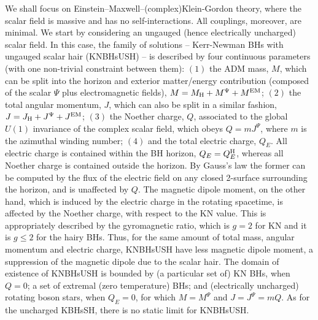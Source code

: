 \documentclass{article}
\begin{document}
We shall focus on Einstein--Maxwell--(complex)Klein-Gordon theory, where the scalar field is massive and has no self-interactions. All couplings, moreover, are minimal. We start by considering an ungauged (hence electrically uncharged) scalar field. In this case, the family of solutions -- Kerr-Newman BHs with ungauged scalar hair (KNBHsUSH) -- is described by four continuous parameters (with one non-trivial constraint between them): $(1)$ the ADM mass, $M$, which can be split into the horizon and exterior matter/energy contribution (composed of the scalar $\Psi$ plus electromagnetic fields), $M=M_{\rm H}+M^\Psi+M^{\rm EM}$; $(2)$ the total angular momentum, $J$, which can also be split in a similar fashion, $J=J_{\rm H}+J^\Psi+J^{\rm EM}$; $(3)$ the  Noether charge, $Q$, associated to the global $U(1)$ invariance of the complex scalar field, which obeys $Q=mJ^\Psi$, where $m$ is the azimuthal winding number; $(4)$ and the total electric charge, $Q_E$. All electric charge is contained within the BH horizon, $Q_E=Q_E^{\rm H}$, whereas all Noether charge is contained outside the horizon. By Gauss's law the former can be computed by the flux of the electric field on any closed 2-surface surrounding the horizon, and is unaffected by $Q$. The magnetic dipole moment, on the other hand, which is induced by the electric charge in the rotating spacetime, is affected by the Noether charge, with respect  to the KN value. This is appropriately described by the gyromagnetic ratio, which is $g=2$ for KN and it is $g\leqslant 2$ for the hairy BHs. Thus, for the same amount of total mass, angular momentum and electric charge, KNBHsUSH have less magnetic dipole moment, a suppression of the magnetic dipole due to the scalar hair. The domain of existence of KNBHsUSH is bounded by (a particular set of) KN BHs, when $Q=0$; a set of extremal (zero temperature) BHs; and (electrically uncharged) rotating boson stars, when $Q_E=0$, for which $M=M^\Psi$ and $J=J^\Psi=mQ$.  As for the uncharged KBHsSH, there is no static limit for KNBHsUSH.

\bigskip
\end{document}
